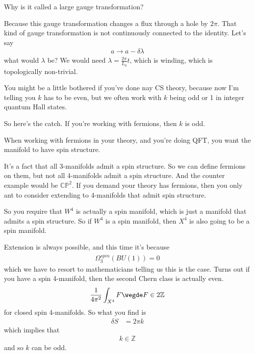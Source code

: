 \begin{question}
    Why is it called a large gauge transformation?
\end{question}
Because this gauge transformation changes a flux through a hole by $2\pi$.
That kind of gauge transformation is not continuously connected to the identity.
Let's say
\begin{align}
    a \to a - \delta \lambda
\end{align}
what would $\lambda$ be?
We would need $\lambda = \frac{2\pi}{L_0}t$,
which is winding,
which is topologically non-trivial.

You might be a little bothered if you've done nay CS theory,
because now I'm telling you $k$ has to be even,
but we often work with $k$ being odd or 1 in integer quantum Hall states.

So here's the catch.
If you're working with fermions,
then $k$ is odd.

When working with fermions in your theory,
and you're doing QFT,
you want the manifold to have spin structure.

It's a fact that all 3-manifolds
admit a spin structure.
So we can define fermions on them,
but not all 4-manifolds admit a spin structure.
And the counter example would be $\mathbb{CP}^2$.
If you demand your theory has fermions,
then you only ant to consider extending to 4-manifolds
that admit spin structure.

So you require that $W^4$ is actually a spin manifold,
which is just a manifold that admits a spin structure.
So if $W^4$ is a spin manifold,
then $X^4$ is also going to be a spin manifold.

Extension is always possible,
and this time it's because
\begin{align}
    \Omega_3^{spin}\left( BU(1) \right) = 0
\end{align}
which we have to resort to mathematicians telling us this is the case.
Turns out if you have a spin 4-manifold,
then the second Chern class is actually even.
\begin{align}
    \frac{1}{4\pi^2}
    \int_{X^4}
    F\wegde F
    \in 2\mathbb{Z}
\end{align}
for closed spin 4-manifolds.
So what you find is
\begin{align}
    \delta S &= 2\pi k
\end{align}
which implies that
\begin{align}
    k \in \mathbb{Z}
\end{align}
and so $k$ can be odd.

